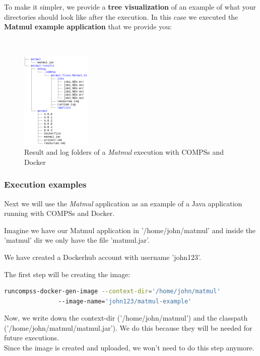 To make it simpler, we provide a \textbf{tree visualization} of an example of what your directories should look like after the execution.
In this case we executed the \textbf{Matmul example application} that we provide you:

~ \newline

\begin{figure}[h!]
  \centering
    \includegraphics[width=0.3\textwidth]{./Sections/5_Execution_Platforms/Figures/docker-matmul-results-tree.png}
    \caption{Result and log folders of a \textit{Matmul} execution with COMPSs and Docker}
    \label{fig:compss_out}
\end{figure}


\clearpage
\subsubsection{Execution examples}

  Next we will use the \textit{Matmul} application as an example of a Java application running with COMPSs and Docker.

Imagine we have our Matmul application in '/home/john/matmul' and inside the 'matmul' dir we only have the file 'matmul.jar'.

We have created a Dockerhub account with username 'john123'.

The first step will be creating the image:
\begin{lstlisting}[language=bash]
runcompss-docker-gen-image --context-dir='/home/john/matmul'
			   --image-name='john123/matmul-example'
\end{lstlisting}

Now, we write down the context-dir ('/home/john/matmul') and the classpath ('/home/john/matmul/matmul.jar'). We do this because they will be needed for future executions. \\

Since the image is created and uploaded, we won't need to do this step anymore.

